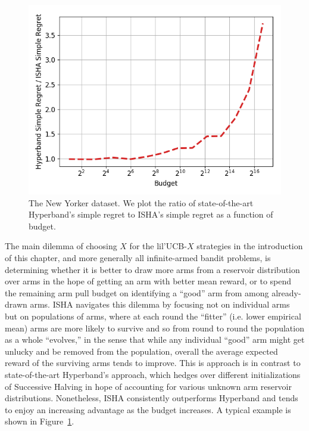 \begin{figure}
\includegraphics[width=.45\textwidth]{fixedbudget/figures/NY.png}
\caption{The New Yorker dataset. We plot the ratio of state-of-the-art 
Hyperband's simple regret to ISHA's simple regret as a function of
budget. }
\label{fig:isha_vs_hb_improvement}
\vspace{-1.5em}
\end{figure}

The main dilemma of choosing $X$ for the lil'UCB-$X$ strategies in the introduction of this chapter, and more generally all infinite-armed bandit problems, is determining whether it is better to draw more arms from a reservoir distribution over arms in the hope of getting an arm with better mean reward, or to spend the remaining arm pull budget on identifying a ``good'' arm from among already-drawn arms.
ISHA navigates this dilemma by focusing not on individual arms but on populations of arms, where at each round the ``fitter'' (i.e. lower empirical mean) arms are more likely to survive and so from round to round the population as a whole ``evolves,'' in the sense that while any individual ``good'' arm might get unlucky and be removed from the population, overall the average expected reward of the surviving arms tends to improve. This is approach is in contrast to state-of-the-art Hyperband's approach, which hedges over different initializations of Successive Halving in hope of accounting for various unknown arm reservoir distributions. Nonetheless, ISHA consistently outperforms Hyperband and tends to enjoy
an increasing advantage as the budget increases.
A typical example is shown in Figure~\ref{fig:isha_vs_hb_improvement}.





